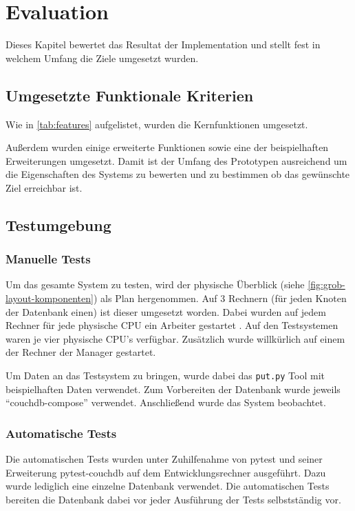 \chapter{Evaluation}
\label{cha:eval}
Dieses Kapitel bewertet das Resultat der Implementation und
stellt fest in welchem Umfang die Ziele umgesetzt wurden.

\section{Umgesetzte Funktionale Kriterien}
\label{sec:eval:features}
Wie in \cref{tab:features} aufgelistet,
wurden die Kernfunktionen umgesetzt.

    

Außerdem wurden einige erweiterte Funktionen sowie eine der beispielhaften Erweiterungen umgesetzt.
Damit ist der Umfang des Prototypen ausreichend um die Eigenschaften des Systems zu bewerten und zu bestimmen ob das gewünschte Ziel erreichbar ist.


\section{Testumgebung}
\label{sec:eval:Testumgebung}

\subsection{Manuelle Tests}
Um das gesamte System zu testen, wird der physische Überblick (siehe \cref{fig:grob-layout-komponenten}) als Plan hergenommen.
Auf 3 Rechnern (für jeden Knoten der Datenbank einen) ist dieser umgesetzt worden.
Dabei wurden auf jedem Rechner für jede physische CPU ein Arbeiter gestartet .
Auf den Testsystemen waren je vier physische CPU's verfügbar.
Zusätzlich wurde willkürlich auf einem der Rechner der Manager gestartet.

Um Daten an das Testsystem zu bringen, wurde dabei das \verb|put.py| Tool mit beispielhaften Daten verwendet.
Zum Vorbereiten der Datenbank wurde jeweils ``couchdb-compose'' \cite{couchdb:compose} verwendet.
Anschließend wurde das System beobachtet.

\subsection{Automatische Tests}
Die automatischen Tests wurden unter Zuhilfenahme von pytest \cite{pytest:website} und seiner Erweiterung  pytest-couchdb \cite{pytest:couchdbkit} auf dem Entwicklungsrechner  ausgeführt.
Dazu wurde lediglich eine einzelne Datenbank verwendet.
Die automatischen Tests bereiten die Datenbank dabei vor jeder Ausführung der Tests selbstständig vor.

